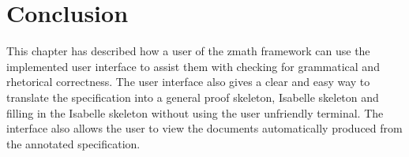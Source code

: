 \section{Conclusion}
This chapter has described how a user of the \gls{zmath} framework can use the implemented user interface to assist them with checking for grammatical and rhetorical correctness. The user interface also gives a clear and easy way to translate the specification into a general proof skeleton, Isabelle skeleton and filling in the Isabelle skeleton without using the user unfriendly terminal. The interface also allows the user to view the documents automatically produced from the annotated specification.